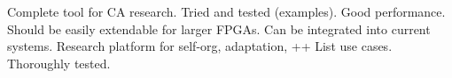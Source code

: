 \TODO
Complete tool for CA research.
Tried and tested (examples).
Good performance.
Should be easily extendable for larger FPGAs.
Can be integrated into current systems.
Research platform for self-org, adaptation, ++
List use cases.
Thoroughly tested.
